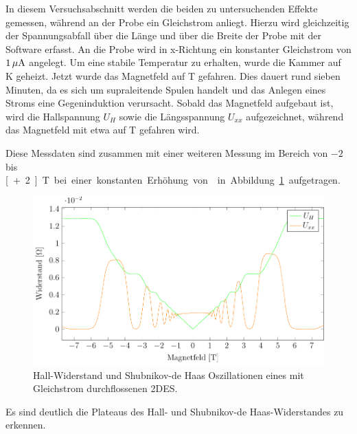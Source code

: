 
In diesem Versuchsabschnitt werden die beiden zu untersuchenden Effekte gemessen, während an der Probe ein Gleichstrom anliegt. Hierzu wird gleichzeitig der Spannungsabfall über die Länge und über die Breite der Probe mit der Software erfasst. An die Probe wird in x-Richtung ein konstanter Gleichstrom von $\unit[1]{\mu A}$ angelegt. Um eine stabile Temperatur zu erhalten, wurde die Kammer auf \unit[2]{K} geheizt. Jetzt wurde das Magnetfeld auf \unit[-7]{T} gefahren. Dies dauert rund sieben Minuten, da es sich um supraleitende Spulen handelt und das Anlegen eines Stroms eine Gegeninduktion verursacht. Sobald das Magnetfeld aufgebaut ist, wird die Hallspannung $U_H$ sowie die Längsspannung $U_{xx}$ aufgezeichnet, während das Magnetfeld mit etwa  auf \unit[7]{T} gefahren wird. 


Diese Messdaten sind zusammen mit einer weiteren Messung im Bereich von $-2$ bis \unit[+2]{T} bei einer konstanten Erhöhung von  in Abbildung~\ref{fig:full_range_dc} aufgetragen.

\begin{figure}[h]
	\centering
	\includegraphics{graphs/dc/full_range.pdf}
	\caption[Gleichstrommessung im maximalen Magnetfeldbereich]{
		Hall-Widerstand und Shubnikov-de Haas Oszillationen eines mit Gleichstrom durchflossenen 2DES.
	}
	\label{fig:full_range_dc}
\end{figure}

Es sind deutlich die Plateaus des Hall- und Shubnikov-de Haas-Widerstandes zu erkennen.